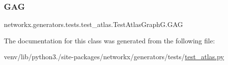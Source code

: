 \subsubsection{\texorpdfstring{G\+AG}{GAG}}
{\footnotesize\ttfamily networkx.\+generators.\+tests.\+test\+\_\+atlas.\+Test\+Atlas\+Graph\+G.\+G\+AG}



The documentation for this class was generated from the following file\+:\begin{DoxyCompactItemize}
\item 
venv/lib/python3./site-\/packages/networkx/generators/tests/\hyperlink{test__atlas_8py}{test\+\_\+atlas.\+py}\end{DoxyCompactItemize}
